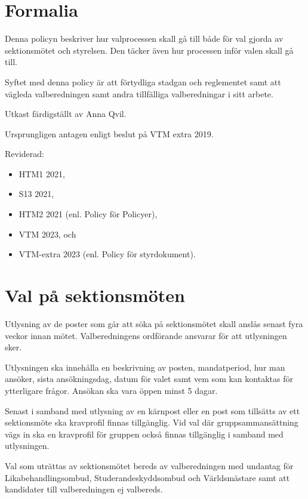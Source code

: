 \documentclass{dsekpolicy}
\begin{document}
\maketitle
\section{Formalia}

Denna policyn beskriver hur valprocessen skall gå till både för val gjorda av
sektionsmötet och styrelsen. Den täcker även hur processen inför valen skall gå
till.

Syftet med denna policy är att förtydliga stadgan och reglementet samt att
vägleda valberedningen samt andra tillfälliga valberedningar i sitt arbete.

Utkast färdigställt av Anna Qvil.

Ursprungligen antagen enligt beslut på VTM extra 2019.

Reviderad:
\begin{itemize}
\item HTM1 2021,
\item S13 2021,
\item HTM2 2021 (enl. Policy för Policyer),
\item VTM 2023, och
\item VTM-extra 2023 (enl. Policy för styrdokument).
\end{itemize}

\section{Val på sektionsmöten}

Utlysning av de poster som går att söka på sektionsmötet skall anslås senast
fyra veckor innan mötet. Valberedningens ordförande ansvarar för att utlysningen
sker.

Utlysningen ska innehålla en beskrivning av posten, mandatperiod, hur man
ansöker, sista ansökningsdag, datum för valet samt vem som kan kontaktas för
ytterligare frågor. Ansökan ska vara öppen minst 5 dagar.

Senast i samband med utlysning av en kärnpost eller en post som tillsätts av ett
sektionsmöte ska kravprofil finnas tillgänglig. Vid val där gruppsammansättning
vägs in ska en kravprofil för gruppen också finnas tillgänglig i samband med
utlysningen.

Val som uträttas av sektionsmötet bereds av valberedningen med undantag för
Likabehandlingsombud, Studerandeskyddsombud och Världsmästare samt att
kandidater till valberedningen ej valbereds.
\end{document}

